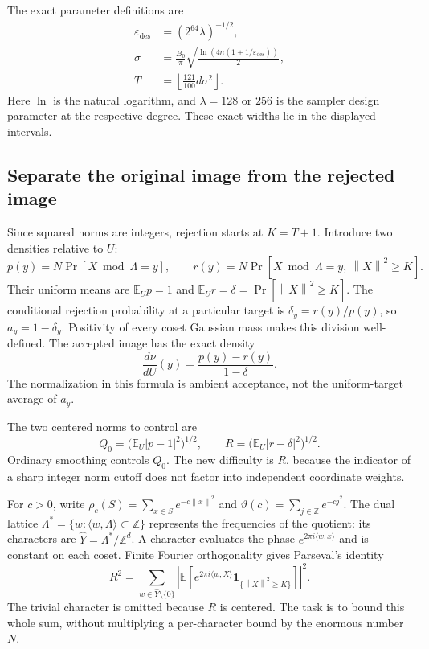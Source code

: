 \documentclass[11pt,a4paper]{article}
\newcommand{\Z}{\mathbb Z}
\newcommand{\E}{\mathbb E}
\newcommand{\eps}{\varepsilon}
\newcommand{\norm}[1]{\left\lVert#1\right\rVert}
\theoremstyle{definition}
\theoremstyle{remark}
\numberwithin{equation}{section}
\begin{document}
The exact parameter definitions are
\[
\begin{aligned}
 \eps_{\mathrm{des}}&=(2^{64}\lambda)^{-1/2},\\
 \sigma&=\frac{B_0}{\pi}
 \sqrt{\frac{\ln(4n(1+1/\eps_{\mathrm{des}}))}{2}},\\
 T&=\left\lfloor\frac{121}{100}d\sigma^2\right\rfloor.
\end{aligned}
\]
Here $\ln$ is the natural logarithm, and $\lambda=128$ or $256$ is the
sampler design parameter at the respective degree. These exact widths lie
in the displayed intervals.

\subsection{Separate the original image from the rejected image}

Since squared norms are integers, rejection starts at $K=T+1$.
Introduce two densities relative to $U$:
\[
 p(y)=N\Pr[X\bmod\Lambda=y],\qquad
 r(y)=N\Pr[X\bmod\Lambda=y,\ \norm X^2\ge K].
\]
Their uniform means are $\E_U p=1$ and
$\E_U r=\delta=\Pr[\norm X^2\ge K]$. The conditional rejection
probability at a particular target is $\delta_y=r(y)/p(y)$, so
$a_y=1-\delta_y$. Positivity of every coset Gaussian mass makes this
division well-defined. The accepted image has the exact density
\begin{equation}
 \frac{d\nu}{dU}(y)=\frac{p(y)-r(y)}{1-\delta}.
 \label{eq:norm-accepted-density}
\end{equation}
The normalization in this formula is ambient acceptance, not the
uniform-target average of $a_y$.

The two centered norms to control are
\[
 Q_0=\bigl(\E_U|p-1|^2\bigr)^{1/2},\qquad
 R=\bigl(\E_U|r-\delta|^2\bigr)^{1/2}.
\]
Ordinary smoothing controls $Q_0$. The new difficulty is $R$, because
the indicator of a sharp integer norm cutoff does not factor into
independent coordinate weights.

For $c>0$, write $\rho_c(S)=\sum_{x\in S}e^{-c\norm x^2}$ and
$\vartheta(c)=\sum_{j\in\Z}e^{-cj^2}$. The dual lattice
$\Lambda^*=\{w:\langle w,\Lambda\rangle\subset\Z\}$ represents the
frequencies of the quotient: its characters are
$\widehat Y=\Lambda^*/\Z^d$. A character evaluates the phase
$e^{2\pi i\langle w,x\rangle}$ and is constant on each coset.
Finite Fourier orthogonality gives Parseval's identity
\begin{equation}
 R^2=\sum_{w\in\widehat Y\setminus\{0\}}
 \left|\E\!\left[e^{2\pi i\langle w,X\rangle}
       \mathbf1_{\{\norm X^2\ge K\}}\right]\right|^2.
 \label{eq:norm-parseval}
\end{equation}
The trivial character is omitted because $R$ is centered. The task is
to bound this whole sum, without multiplying a per-character bound by
the enormous number $N$.
\end{document}
